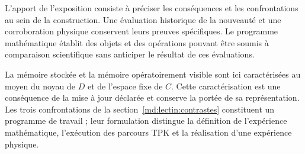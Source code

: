 L'apport de l'exposition consiste à préciser les conséquences et les confrontations au sein de la construction. Une évaluation historique de la nouveauté et une corroboration physique conservent leurs preuves spécifiques. Le programme mathématique établit des objets et des opérations pouvant être soumis à comparaison scientifique sans anticiper le résultat de ces évaluations.

La mémoire stockée et la mémoire opératoirement visible sont ici caractérisées au moyen du noyau de $D$ et de l'espace fixe de $C$. Cette caractérisation est une conséquence de la mise à jour déclarée et conserve la portée de sa représentation. Les trois confrontations de la section~\ref{md:lectin:contrastes} constituent un programme de travail ; leur formulation distingue la définition de l'expérience mathématique, l'exécution des parcours TPK et la réalisation d'une expérience physique.
